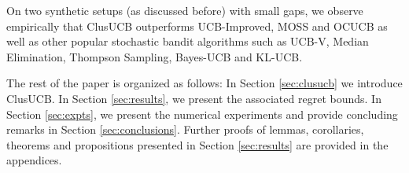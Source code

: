 On two synthetic setups (as discussed before) with small gaps, we observe empirically that ClusUCB outperforms UCB-Improved\cite{auer2010ucb}, MOSS\cite{audibert2009minimax} and OCUCB\cite{lattimore2015optimally} as well as other popular stochastic bandit algorithms such as UCB-V\cite{audibert2009exploration}, Median Elimination\cite{even2006action}, Thompson Sampling\cite{agrawal2011analysis}, Bayes-UCB\cite{kaufmann2012bayesian} and KL-UCB\cite{garivier2011kl}. 

The rest of the paper is organized as follows: In Section \ref{sec:clusucb} we introduce ClusUCB. In Section \ref{sec:results}, we present the associated regret bounds. In Section \ref{sec:expts}, we present the numerical experiments and provide concluding remarks in Section \ref{sec:conclusions}. Further proofs of lemmas, corollaries, theorems and propositions presented in Section \ref{sec:results}  are provided in the appendices. 

